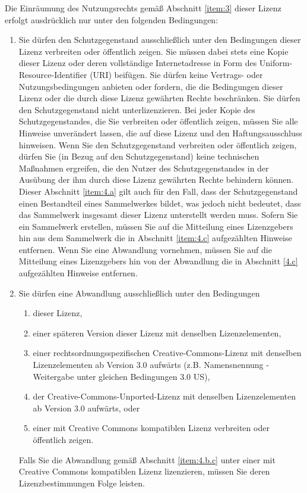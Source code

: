 \begin{enumerate}
Die Einräumung des Nutzungsrechts gemäß Abschnitt \ref{item:3} dieser Lizenz erfolgt ausdrücklich nur unter den folgenden Bedingungen:
    \begin{enumerate}
      \item \label{item:4.a} Sie dürfen den Schutzgegenstand ausschließlich unter den Bedingungen dieser Lizenz verbreiten oder öffentlich zeigen. Sie müssen dabei stets eine Kopie dieser Lizenz oder deren vollständige Internetadresse in Form des Uniform-Resource-Identifier (URI) beifügen. Sie dürfen keine Vertrags- oder Nutzungsbedingungen anbieten oder fordern, die die Bedingungen dieser Lizenz oder die durch diese Lizenz gewährten Rechte beschränken. Sie dürfen den Schutzgegenstand nicht unterlizenzieren. Bei jeder Kopie des Schutzgegenstandes, die Sie verbreiten oder öffentlich zeigen, müssen Sie alle Hinweise unverändert lassen, die auf diese Lizenz und den Haftungsausschluss hinweisen. Wenn Sie den Schutzgegenstand verbreiten oder öffentlich zeigen, dürfen Sie (in Bezug auf den Schutzgegenstand) keine technischen Maßnahmen ergreifen, die den Nutzer des Schutzgegenstandes in der Ausübung der ihm durch diese Lizenz gewährten Rechte behindern können. Dieser Abschnitt \ref{item:4.a} gilt auch für den Fall, dass der Schutzgegenstand einen Bestandteil eines Sammelwerkes bildet, was jedoch nicht bedeutet, dass das Sammelwerk insgesamt dieser Lizenz unterstellt werden muss. Sofern Sie ein Sammelwerk erstellen, müssen Sie auf die Mitteilung eines Lizenzgebers hin aus dem Sammelwerk die in Abschnitt \ref{item:4.c} aufgezählten Hinweise entfernen. Wenn Sie eine Abwandlung vornehmen, müssen Sie auf die Mitteilung eines Lizenzgebers hin von der Abwandlung die in Abschnitt \ref{4.c} aufgezählten Hinweise entfernen.
      \item \label{item:4.b} Sie dürfen eine Abwandlung ausschließlich unter den Bedingungen
        \begin{enumerate}
          \item \label{item:4.b.i} dieser Lizenz,
          \item einer späteren Version dieser Lizenz mit denselben Lizenzelementen,
          \item einer rechtsordnungsspezifischen Creative-Commons-Lizenz mit denselben Lizenzelementen ab Version 3.0 aufwärts (z.B. Namensnennung - Weitergabe unter gleichen Bedingungen 3.0 US),
	  \item \label{item:4.b.iv} der Creative-Commons-Unported-Lizenz mit denselben Lizenzelementen ab Version 3.0 aufwärts, oder
          \item \label{item:4.b.v} einer mit Creative Commons kompatiblen Lizenz verbreiten oder öffentlich zeigen.
        \end{enumerate}
Falls Sie die Abwandlung gemäß Abschnitt \ref{item:4.b.c} unter einer mit Creative Commons kompatiblen Lizenz lizenzieren, müssen Sie deren Lizenzbestimmungen Folge leisten.


\end{enumerate}
\end{enumerate}
